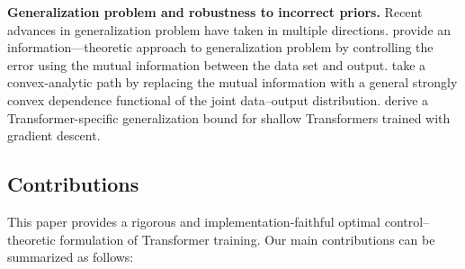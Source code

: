 \documentclass[11pt]{article}
\begin{document}
\noindent\textbf{Generalization problem and robustness to incorrect priors.} Recent advances in generalization problem have taken in multiple directions. \cite{xu2017information} provide an information---theoretic approach to generalization problem by controlling the error using the mutual information between the data set and output. \cite{lugosi2022generalization} take a convex-analytic path by replacing the mutual information with a general strongly convex dependence functional of the joint data–output distribution. \cite{mwigo2025generalization} derive a Transformer-specific generalization bound for shallow Transformers trained with gradient descent.

\subsection{Contributions} This paper provides a rigorous and implementation-faithful optimal control--theoretic formulation of Transformer training. Our main contributions can be summarized as follows:
\end{document}
